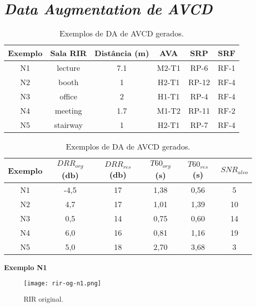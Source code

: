 \pagebreak
\section{\textit{Data Augmentation de AVCD}}

\begin{table} [H]
    \centering
    \caption{Exemplos de DA de AVCD gerados.}
    \label{tbl-a:da-noise}
    \begin{tabular}{c|c|c|c|c|c}

        \textbf{Exemplo} & 
        \textbf{Sala RIR} & 
        \textbf{Distância (m)} &
        \textbf{AVA} &
        \textbf{SRP} &
        \textbf{SRF} \\
        \hline 

        N1 & lecture & 7.1 & M2-T1 & RP-6 & RF-1 \\
        N2 & booth & 1 & H2-T1 & RP-12 & RF-4 \\
        N3 & office & 2 & H1-T1 & RP-4 & RF-4 \\
        N4 & meeting & 1.7 & M1-T2 & RP-11 & RF-2 \\
        N5 & stairway & 1 & H2-T1 & RP-7 & RF-4 \\

    \end{tabular}
    \bigbreak
    \bigbreak
    \begin{tabular}{c|c|c|c|c|c}

        \textbf{Exemplo} & 
        \textbf{$DRR_{org}$ (db)} & 
        \textbf{$DRR_{res}$ (db)} & 
        \textbf{$T60_{org}$ (s)} & 
        \textbf{$T60_{res}$ (s)} &
        \textbf{$SNR_{alvo}$} \\
        \hline 

        N1 & -4,5 & 17 & 1,38 & 0,56 & 5 \\
        N2 & 4,7 & 17 & 1,01 & 1,39 & 10 \\
        N3 & 0,5 & 14 & 0,75 & 0,60 & 14 \\
        N4 & 6,0 & 16 & 0,81 & 1,16 & 19 \\
        N5 & 5,0 & 18 & 2,70 & 3,68 & 3 \\

    \end{tabular}
\end{table}

\pagebreak
{\Large \textbf{Exemplo N1}}

\begin{figure} [H]
    \centering
    \texttt{[image: rir-og-n1.png]}
    \caption{RIR original.}
    \label{fig-a:rir-og-n1}
\end{figure} 

